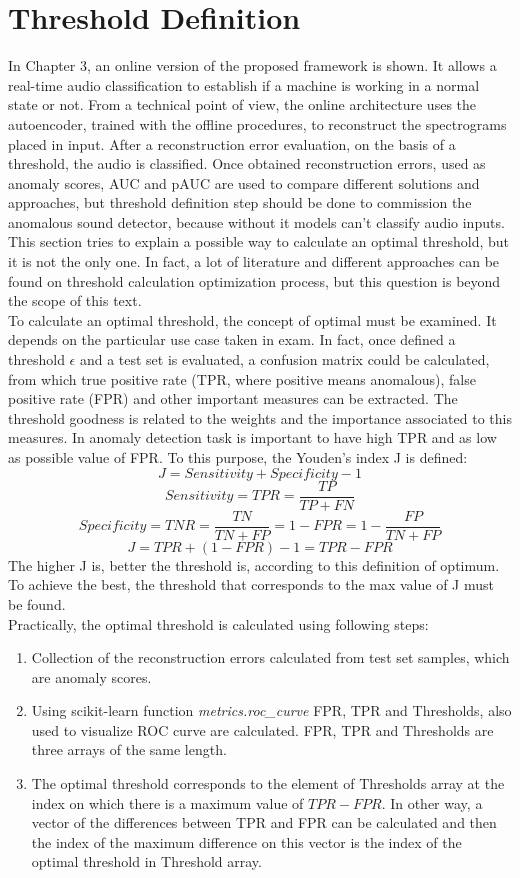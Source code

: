 \section{Threshold Definition}
In Chapter 3, an online version of the proposed framework is shown. It allows a real-time audio classification to establish if a machine is working in a normal state or not. From a technical point of view, the online architecture uses the autoencoder, trained with the offline procedures, to reconstruct the spectrograms placed in input. After a reconstruction error evaluation, on the basis of a threshold, the audio is classified. Once obtained reconstruction errors, used as anomaly scores, AUC and pAUC are used to compare different solutions and approaches, but threshold definition step should be done to commission the anomalous sound detector, because without it models can't classify audio inputs. This section tries to explain a possible way to calculate an optimal threshold, but it is not the only one. In fact, a lot of literature and different approaches can be found on threshold calculation optimization process, but this question is beyond the scope of this text. \\
To calculate an optimal threshold, the concept of optimal must be examined. It depends on the particular use case taken in exam. In fact, once defined a threshold $\epsilon$ and a test set is evaluated, a confusion matrix could be calculated, from which true positive rate (TPR, where positive means anomalous), false positive rate (FPR) and other important measures can be extracted. The threshold goodness is related to the weights and the importance associated to this measures. In anomaly detection task is important to have high TPR and as low as possible value of FPR. To this purpose, the Youden's index J is defined\cite{13RealTimeDetectionUsingSequentialAutoencoder}:
\[ J = Sensitivity + Specificity - 1\]\[ Sensitivity = TPR = \frac{TP}{TP+FN}\]\[ Specificity = TNR = \frac{TN}{TN+FP} = 1-FPR = 1-\frac{FP}{TN+FP}\]\[ J = TPR+(1-FPR)-1 = TPR-FPR \]
The higher J is, better the threshold is, according to this definition of optimum. To achieve the best, the threshold that corresponds to the max value of J must be found.\\
Practically, the optimal threshold is calculated using following steps:
\begin{enumerate}
    \item {Collection of the reconstruction errors calculated from test set samples, which are anomaly scores.}
    \item {Using scikit-learn function \textit{metrics.roc\_curve} FPR, TPR and Thresholds, also used to visualize ROC curve are calculated. FPR, TPR and Thresholds are three arrays of the same length.}
    \item {The optimal threshold corresponds to the element of Thresholds array at the index on which there is a maximum value of $TPR-FPR$. In other way, a vector of the differences between TPR and FPR can be calculated and then the index of the maximum difference on this vector is the index of the optimal threshold in Threshold array.}
\end{enumerate}
